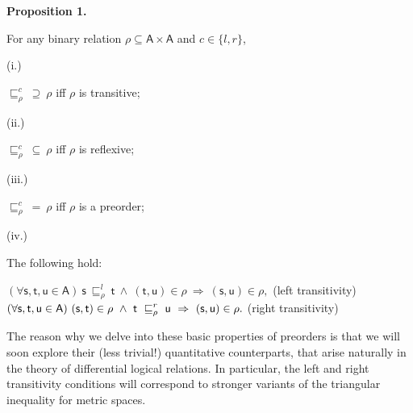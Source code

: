  
 
\par\medskip\noindent\textbf{Proposition 1.}\par
 
 
For any binary relation $\rho\subseteq\mathsf{A}\times\mathsf{A}$ and $c\in\{l,r\}$,\par
  
\par\noindent  (i.) 
 
$\sqsubseteq^{c}_{\rho}\ \supseteq\ \rho$ iff $\rho$ is transitive;\par
 
 
 
\par\noindent  (ii.) 
 
$\sqsubseteq^{c}_{\rho}\ \subseteq\ \rho$ iff $\rho$ is reflexive;\par
 
 
 
\par\noindent  (iii.) 
 
$\sqsubseteq^{c}_{\rho}\ =\ \rho$ iff $\rho$ is a preorder;\par
 
 
 
\par\noindent  (iv.) 
 
The following hold:\par
 
 
     $\displaystyle(\forall\mathsf{s},\mathsf{t},\mathsf{u}\in\mathsf{A})\ \mathsf{s%
}\ \sqsubseteq^{l}_{\rho}\ \mathsf{t}\ \land\ (\mathsf{t},\mathsf{u})\in\rho\ %
\Rightarrow\ (\mathsf{s},\mathsf{u})\in\rho,$  (left transitivity)    $\displaystyle(\forall\mathsf{s},\mathsf{t},\mathsf{u}\in\mathsf{A})\ (\mathsf{%
s},\mathsf{t})\in\rho\ \land\ \mathsf{t}\ \sqsubseteq^{r}_{\rho}\ \mathsf{u}\ %
\Rightarrow\ (\mathsf{s},\mathsf{u})\in\rho.$  (right transitivity)   
 
 
 
The reason why we delve into these basic properties of preorders is that we will soon explore their (less trivial!) quantitative counterparts, that arise naturally in the theory of differential logical relations. In particular, the left and right transitivity conditions will correspond to stronger variants of the triangular inequality for metric spaces.\par
 

